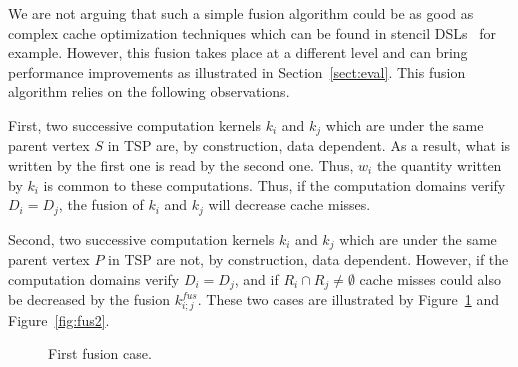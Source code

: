 We are not arguing that such a simple fusion algorithm could be as good as complex cache optimization techniques which can be found in stencil DSLs~\cite{spaaTangCKLL11} for example. However, this fusion takes place at a different level and can bring performance improvements as illustrated in Section~\ref{sect:eval}. This fusion algorithm relies on the following observations.

First, two successive computation kernels $k_i$ and $k_j$ which are under the same parent vertex $S$ in TSP are, by construction, data dependent. As a result, what is written by the first one is read by the second one. Thus, $w_i$ the quantity written by $k_i$ is common to these computations. Thus, if the computation domains verify $D_i=D_j$, the fusion of $k_i$ and $k_j$ will decrease cache misses.

Second, two successive computation kernels $k_i$ and $k_j$ which are under the same parent vertex $P$ in TSP are not, by construction, data dependent. However, if the computation domains verify $D_i=D_j$, and if $R_i \cap R_j \neq \emptyset$ cache misses could also be decreased by the fusion $k_{i;j}^{fus}$.
These two cases are illustrated by Figure~\ref{fig:fus1} and Figure~\ref{fig:fus2}.

\begin{figure}[h!]
\begin{center}
\caption{First fusion case.}
\label{fig:fus1}
\end{center}
\end{figure}

